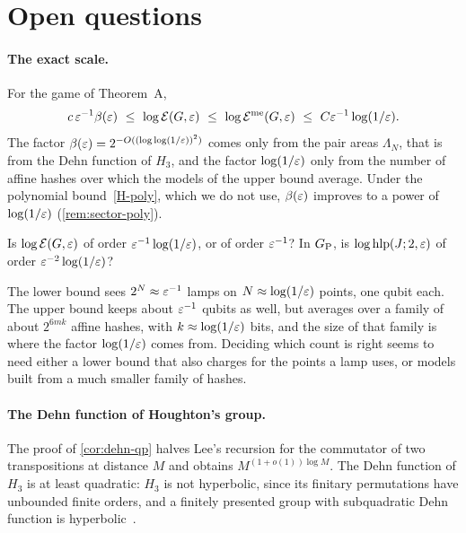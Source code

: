 \section{Open questions}\label{sec:open}

\paragraph{The exact scale.} For the game of Theorem~A,
\[
c\,\eps^{-1}\bfun(\eps)\ \le\ \log\Ent(G,\eps)\ \le\ \log\Entme(G,\eps)\ \le\ C\eps^{-1}\log(1/\eps).
\]
The factor $\beta(\varepsilon)=2^{-O((\log\log(1/\varepsilon))^2)}$ comes only from the pair areas $\Lambda_N$, that is from the Dehn function of $H_3$, and
the factor $\log(1/\varepsilon)$ only from the number of affine hashes over which the models of the upper bound average. Under the polynomial bound~\ref{H-poly}, which
we do not use, $\beta(\varepsilon)$ improves to a power of $\log(1/\varepsilon)$ (\cref{rem:sector-poly}).

\begin{question}\label{q:scale}
Is $\log\mathcal E(G,\varepsilon)$ of order $\varepsilon^{-1}\log(1/\varepsilon)$, or of order $\varepsilon^{-1}$? In $G_{\mathrm P}$, is $\log\operatorname{hlp}(J;2,\varepsilon)$ of order
$\varepsilon^{-2}\log(1/\varepsilon)$?
\end{question}

The lower bound sees $2^N\approx\varepsilon^{-1}$ lamps on $N\approx\log(1/\varepsilon)$ points, one qubit each. The upper bound keeps about $\varepsilon^{-1}$
qubits as well, but averages over a family of about $2^{6mk}$ affine hashes, with $k\approx\log(1/\varepsilon)$ bits, and the size of that family is
where the factor $\log(1/\varepsilon)$ comes from. Deciding which count is right seems to need either a lower bound that also charges for the
points a lamp uses, or models built from a much smaller family of hashes.

\paragraph{The Dehn function of Houghton's group.} The proof of \cref{cor:dehn-qp} halves Lee's recursion for the commutator of two
transpositions at distance $M$ and obtains $M^{(1+o(1))\log M}$. The Dehn function of $H_3$ is at least quadratic: $H_3$ is not hyperbolic,
since its finitary permutations have unbounded finite orders, and a finitely presented group with subquadratic Dehn function is
hyperbolic~\cite{Bri02}.


